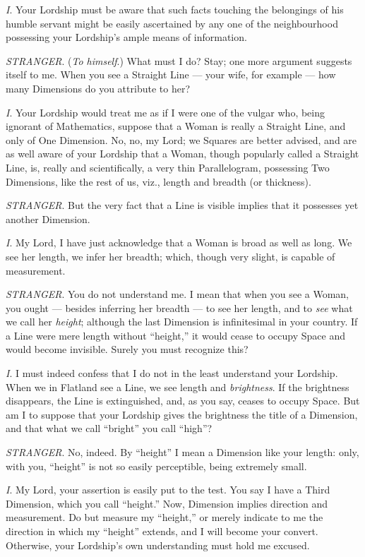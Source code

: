 \documentclass[10pt, kindle, oneside]{kindle}
\begin{document}
\emph{I}. Your Lordship must be aware that such facts touching the belongings of his
humble servant might be easily ascertained by any one of the neighbourhood
possessing your Lordship's ample means of information.

\emph{STRANGER}. (\emph{To himself}.) What must I do? Stay; one more argument suggests
itself to me. When you see a Straight Line --- your wife, for example --- how many
Dimensions do you attribute to her?

\emph{I}. Your Lordship would treat me as if I were one of the vulgar who, being
ignorant of Mathematics, suppose that a Woman is really a Straight Line, and
only of One Dimension. No, no, my Lord; we Squares are better advised, and are
as well aware of your Lordship that a Woman, though popularly called a
Straight Line, is, really and scientifically, a very thin Parallelogram,
possessing Two Dimensions, like the rest of us, viz., length and breadth (or
thickness).

\emph{STRANGER}. But the very fact that a Line is visible implies that it possesses
yet another Dimension.

\emph{I}. My Lord, I have just acknowledge that a Woman is broad as well as long. We
see her length, we infer her breadth; which, though very slight, is capable of
measurement.

\emph{STRANGER}. You do not understand me. I mean that when you see a Woman, you
ought --- besides inferring her breadth --- to see her length, and to \emph{see} what we
call her \emph{height}; although the last Dimension is infinitesimal in your country.
If a Line were mere length without ``height,'' it would cease to occupy Space
and would become invisible. Surely you must recognize this?

\emph{I}. I must indeed confess that I do not in the least understand your Lordship.
When we in Flatland see a Line, we see length and \emph{brightness}. If the
brightness disappears, the Line is extinguished, and, as you say, ceases to
occupy Space. But am I to suppose that your Lordship gives the brightness the
title of a Dimension, and that what we call ``bright'' you call ``high''?

\emph{STRANGER}. No, indeed. By ``height'' I mean a Dimension like your length: only,
with you, ``height'' is not so easily perceptible, being extremely small.

\emph{I}. My Lord, your assertion is easily put to the test. You say I have a Third
Dimension, which you call ``height.'' Now, Dimension implies direction and
measurement. Do but measure my ``height,'' or merely indicate to me the
direction in which my ``height'' extends, and I will become your convert.
Otherwise, your Lordship's own understanding must hold me excused.
\end{document}
